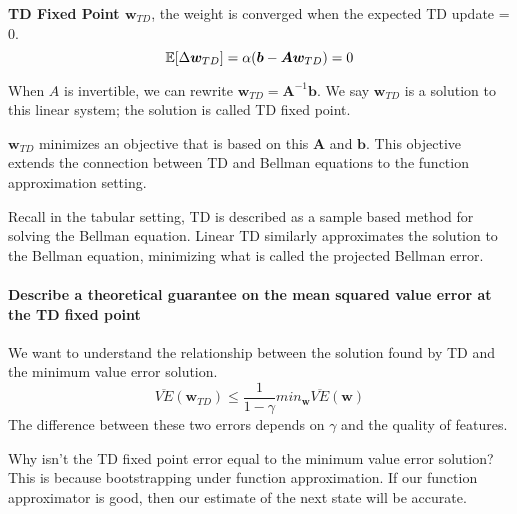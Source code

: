 \documentclass[sutton_barto_notes.tex]{subfiles}
\begin{document}
\begin{definition}
\textbf{TD Fixed Point $\bm{w}_{TD}$}, the weight is converged when the expected TD update = 0.
$$\operatorname*{\mathbb{E}}[\Delta \bm{w}_{TD}] = \alpha(\bm{b} - \bm{A}\bm{w}_{TD}) = 0$$
\end{definition}
When $A$ is invertible, we can rewrite $\bm{w}_{TD} = \bm{A}^{-1}\bm{b}$. We say $\bm{w}_{TD}$ is a solution to this linear system; the solution is called TD fixed point.

$\bm{w}_{TD}$ minimizes an objective that is based on this $\bm{A}$ and $\bm{b}$. This objective extends the connection between TD and Bellman equations to the function approximation setting.

Recall in the tabular setting, TD is described as a sample based method for solving the Bellman equation. Linear TD similarly approximates the solution to the Bellman equation, minimizing what is called the projected Bellman error.

\paragraph{Describe a theoretical guarantee on the mean squared value error at the TD fixed point}

We want to understand the relationship between the solution found by TD and the minimum value error solution.
$$\overline{VE}(\bm{w}_{TD}) \leq \frac{1}{1-\gamma}min_{\bm{w}}\overline{VE}(\bm{w})$$
The difference between these two errors depends on $\gamma$ and the quality of features.

Why isn't the TD fixed point error equal to the minimum value error solution? This is because bootstrapping under function approximation. If our function approximator is good, then our estimate of the next state will be accurate.
\end{document}
